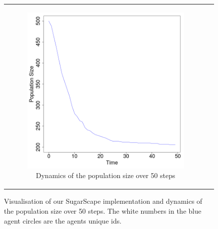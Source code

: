 \documentclass{bmcart}
\begin{document}
\begin{backmatter}
\begin{figure}[h!]
\begin{center}
\begin{tabular}{c c}
		\begin{subfigure}[b]{0.4\textwidth}
			\centering
			\includegraphics[width=1\textwidth, angle=0]{./sugarscape_population_dynamics.png}
			\caption{Dynamics of the population size over 50 steps}
			\label{fig:vis_sugarscape_t50_dynamics}
		\end{subfigure}
	\end{tabular}
	
	\caption{Visualisation of our SugarScape implementation and dynamics of the population size over 50 steps. The white numbers in the blue agent circles are the agents unique ids.}
	\label{fig:vis_sugarscape}
\end{center}
\end{figure}


\end{backmatter}
\end{document}
